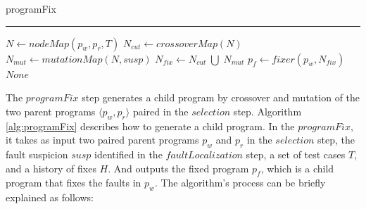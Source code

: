 \documentclass[10pt,conference]{IEEEtran}
\newcommand{\hrulealg}[0]{\vspace{1mm} \hrule \vspace{1mm}}
\begin{document}
        \begin{algorithm}[hbt!]
            \caption{programFix} \label{alg:programFix}
            \hrulealg
            $N \gets nodeMap(p_{w}, p_{r}, T)$\;
            {
                $N_{cut} \gets crossoverMap(N)$\;
                $N_{mut} \gets mutationMap(N, susp)$\;
                $N_{fix} \gets N_{cut}\;\bigcup\;N_{mut}$\;
                $p_{f} \gets fixer(p_{w}, N_{fix})$\;
            }
            \Return $None$\;
        \end{algorithm}

        The $programFix$ step generates a child program by crossover and mutation of the two parent programs $\langle p_{w}, p_{r} \rangle$ paired in the $selection$ step. Algorithm \ref{alg:programFix} describes how to generate a child program. In the $programFix$, it takes as input two paired parent programs $p_{w}$ and $p_{r}$ in the $selection$ step, the fault suspicion $susp$ identified in the $faultLocalization$ step, a set of test cases $T$, and a history of fixes $H$. And outputs the fixed program $p_{f}$, which is a child program that fixes the faults in $p_{w}$. The algorithm's process can be briefly explained as follows:
\end{document}

